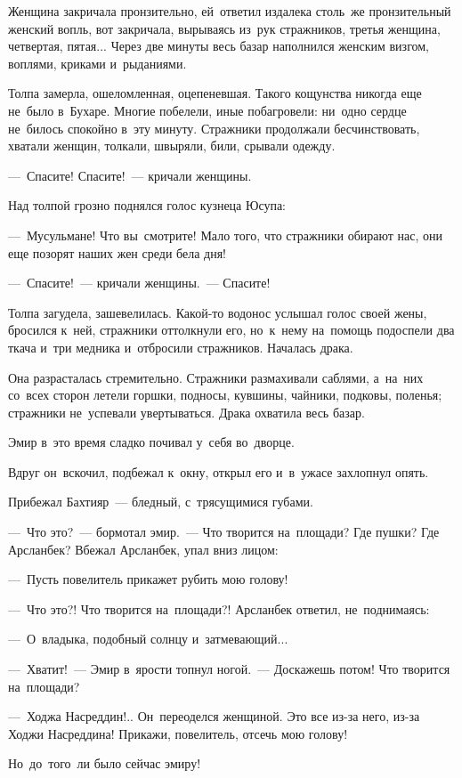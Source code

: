 \documentclass[12pt,a4paper]{book}
\begin{document}
Женщина закричала пронзительно, ей~ответил издалека столь~же пронзительный женский вопль, вот закричала, вырываясь из~рук стражников, третья женщина, четвертая, пятая... Через две минуты весь базар наполнился женским визгом, воплями, криками и~рыданиями.

Толпа замерла, ошеломленная, оцепеневшая. Такого кощунства никогда еще не~было в~Бухаре. Многие побелели, иные побагровели: ни~одно сердце не~билось спокойно в~эту минуту. Стражники продолжали бесчинствовать, хватали женщин, толкали, швыряли, били, срывали одежду.

—~Спасите! Спасите!~— кричали женщины.

Над толпой грозно поднялся голос кузнеца Юсупа:

—~Мусульмане! Что вы~смотрите! Мало того, что стражники обирают нас, они еще позорят наших жен среди бела дня!

—~Спасите!~— кричали женщины.~— Спасите!

Толпа загудела, зашевелилась. Какой-то водонос услышал голос своей жены, бросился к~ней, стражники оттолкнули его, но~к~нему на~помощь подоспели два ткача и~три медника и~отбросили стражников. Началась драка.

Она разрасталась стремительно. Стражники размахивали саблями, а~на~них со~всех сторон летели горшки, подносы, кувшины, чайники, подковы, поленья; стражники не~успевали увертываться. Драка охватила весь базар.

Эмир в~это время сладко почивал у~себя во~дворце.

Вдруг он~вскочил, подбежал к~окну, открыл его и~в~ужасе захлопнул опять.

Прибежал Бахтияр~— бледный, с~трясущимися губами.

—~Что это?~— бормотал эмир.~— Что творится на~площади? Где пушки? Где Арсланбек? Вбежал Арсланбек, упал вниз лицом:

—~Пусть повелитель прикажет рубить мою голову!

—~Что это?! Что творится на~площади?! Арсланбек ответил, не~поднимаясь:

—~О~владыка, подобный солнцу и~затмевающий...

—~Хватит!~— Эмир в~ярости топнул ногой.~— Доскажешь потом! Что творится на~площади?

—~Ходжа Насреддин!.. Он~переоделся женщиной. Это все из-за него, из-за Ходжи Насреддина! Прикажи, повелитель, отсечь мою голову!

Но~до~того~ли было сейчас эмиру!
\end{document}
